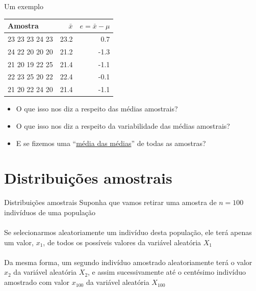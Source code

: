 \documentclass[10pt]{beamer}\usepackage[]{graphicx}\usepackage[]{color}
\theoremstyle{definition}
\begin{document}
\begin{frame}{Um exemplo}
  \begin{table}[h]
    \centering
    \begin{tabular}{lrr}
      \hline
      Amostra & $\bar{x}$ & $e = \bar{x} - \mu$ \\
      \hline
      23 23 23 24 23 & 23.2 & 0.7 \\
      24 22 20 20 20 & 21.2 & -1.3 \\
      21 20 19 22 25 & 21.4 & -1.1 \\
      22 23 25 20 22 & 22.4 & -0.1 \\
      21 20 22 24 20 & 21.4 & -1.1 \\
      \hline
    \end{tabular}
  \end{table}
  \begin{itemize}
  \item O que isso nos diz a respeito das médias amostrais?
  \item O que isso nos diz a respeito da variabilidade das médias
    amostrais?
  \item E se fizemos uma ``\underline{média das médias}'' de todas as
    amostras?
  \end{itemize}
\end{frame}

\section{Distribuições amostrais}

\begin{frame}[fragile=singleslide]{Distribuições amostrais}
  Suponha que vamos retirar uma amostra de $n = 100$ indivíduos de uma
  população \\~\\
  Se selecionarmos aleatoriamente um indivíduo desta população, ele terá
  apenas um valor, $x_1$, de todos os possíveis valores da variável
  aleatória $X_1$ \\~\\
  Da mesma forma, um segundo indivíduo amostrado aleatoriamente terá o
  valor $x_2$ da variável aleatória $X_2$, e assim sucessivamente até o
  centésimo indivíduo amostrado com valor $x_{100}$ da variável
  aleatória $X_{100}$
\end{frame}
\end{document}
